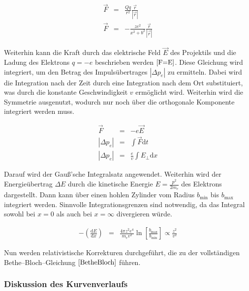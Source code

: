 \documentclass[12pt,a4paper]{scrartcl}
\numberwithin{equation}{section} %
\begin{document}
\begin{eqnarray}
    \vec F &=& \frac{Qq}{r^2} \frac{\vec{r}}{\left|\vec r\right|} \\
    \vec F &=& -\frac{ze^2}{x^2+b^2} \frac{\vec{r}}{\left|\vec r\right|}
\end{eqnarray}

\noindent
Weiterhin kann die Kraft durch das elektrische Feld $\vec E$ des Projektils und die Ladung des Elektrons $q=-e$ beschrieben werden $\eqref{F=E}$. Diese Gleichung wird integriert, um den Betrag des Impulsübertrages $\left|\Delta p_e\right|$ zu ermitteln. Dabei wird die Integration nach der Zeit durch eine Integration nach dem Ort substituiert, was durch die konstante Geschwindigkeit $v$ ermöglicht wird. Weiterhin wird die Symmetrie ausgenutzt, wodurch nur noch über die orthogonale Komponente integriert werden muss.

\begin{eqnarray}
    \vec F &=& -e \vec E \label{F=E} \\
    \left|\Delta p_e\right| &=& \int \vec F \mathrm dt \\
    \left|\Delta p_e\right| &=& \frac{e}{v} \int E_\perp \mathrm dx
\end{eqnarray}

\noindent
Darauf wird der Gauß'sche Integralsatz angewendet. Weiterhin wird der Energieübertrag $\Delta E$ durch die kinetische Energie $E=\frac{p^2}{2m_e}$ des Elektrons dargestellt. Dann kann über einen hohlen Zylinder vom Radius $b_\mathrm{min}$ bis $b_\mathrm{max}$ integriert werden. Sinnvolle Integrationsgrenzen sind notwendig, da das Integral sowohl bei $x=0$ als auch bei $x=\infty$ divergieren würde.

\begin{eqnarray}
    -\left(\frac{\mathrm dE}{\mathrm dx}\right)
        &=& \frac{4\pi z^2 e^4}{m_ev^2}
            \ln\left[\frac{b_\mathrm{max}}{b_\mathrm{min}}\right]
            \propto \frac{z^2}{v^2}
\end{eqnarray}

\noindent
Nun werden relativistische Korrekturen durchgeführt, die zu der vollständigen Bethe--Bloch--Gleichung $\eqref{BetheBloch}$ führen.

\hypertarget{diskussion-des-kurvenverlaufs}{%
\subsubsection{Diskussion des
Kurvenverlaufs}\label{diskussion-des-kurvenverlaufs}}
\end{document}

